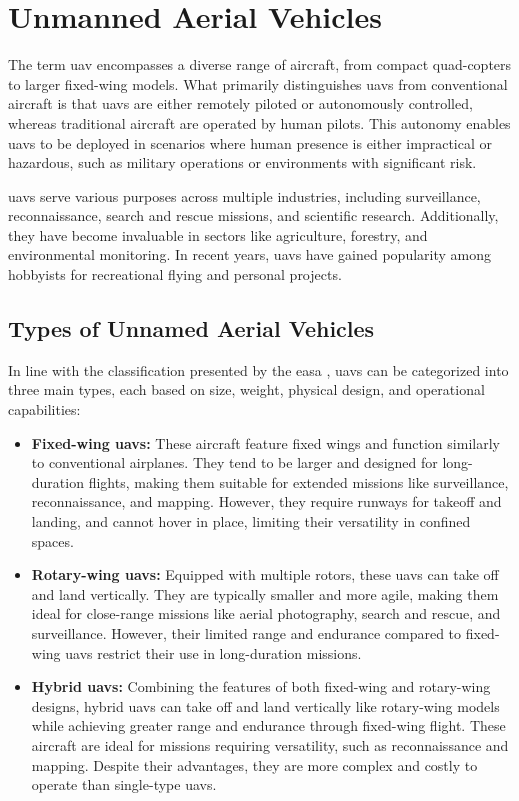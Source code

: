 \chapter{Unmanned Aerial Vehicles}\label{ch:unmanned_aerial_vehicles}

The term \gls{uav} encompasses a diverse range of aircraft, from compact quad-copters to larger fixed-wing models. What primarily distinguishes \glspl{uav} from conventional aircraft is that \glspl{uav} are either remotely piloted or autonomously controlled, whereas traditional aircraft are operated by human pilots. This autonomy enables \glspl{uav} to be deployed in scenarios where human presence is either impractical or hazardous, such as military operations or environments with significant risk.

\glspl{uav} serve various purposes across multiple industries, including surveillance, reconnaissance, search and rescue missions, and scientific research. Additionally, they have become invaluable in sectors like agriculture, forestry, and environmental monitoring. In recent years, \glspl{uav} have gained popularity among hobbyists for recreational flying and personal projects.

\section{Types of Unnamed Aerial Vehicles}

In line with the classification presented by the \gls{easa} \autocite{eu-947-2019}, \glspl{uav} can be categorized into three main types, each based on size, weight, physical design, and operational capabilities:

\begin{itemize}
  \item \textbf{Fixed-wing \glspl{uav}:} These aircraft feature fixed wings and function similarly to conventional airplanes. They tend to be larger and designed for long-duration flights, making them suitable for extended missions like surveillance, reconnaissance, and mapping. However, they require runways for takeoff and landing, and cannot hover in place, limiting their versatility in confined spaces.

  \item \textbf{Rotary-wing \glspl{uav}:} Equipped with multiple rotors, these \glspl{uav} can take off and land vertically. They are typically smaller and more agile, making them ideal for close-range missions like aerial photography, search and rescue, and surveillance. However, their limited range and endurance compared to fixed-wing \glspl{uav} restrict their use in long-duration missions.

  \item \textbf{Hybrid \glspl{uav}:} Combining the features of both fixed-wing and rotary-wing designs, hybrid \glspl{uav} can take off and land vertically like rotary-wing models while achieving greater range and endurance through fixed-wing flight. These aircraft are ideal for missions requiring versatility, such as reconnaissance and mapping. Despite their advantages, they are more complex and costly to operate than single-type \glspl{uav}.
\end{itemize}


